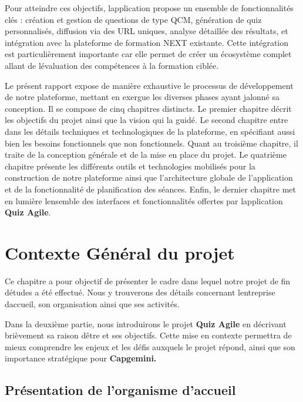 \documentclass[12pt,a4paper,twoside,openright]{report}
\let\origchapter\chapter
\renewcommand{\chapter}[1]{%
  \cleardoublepage%
  \origchapter{#1}%
}
\begin{document}
Pour atteindre ces objectifs, l\textquotesingle application propose un
ensemble de fonctionnalités clés : création et gestion de questions de
type QCM, génération de quiz personnalisés, diffusion via des URL
uniques, analyse détaillée des résultats, et intégration avec la
plateforme de formation NEXT existante. Cette intégration est
particulièrement importante car elle permet de créer un écosystème
complet allant de l\textquotesingle évaluation des compétences à la
formation ciblée.

Le présent rapport expose de manière exhaustive le processus de
développement de notre plateforme, mettant en exergue les diverses
phases ayant jalonné sa conception. Il se compose de cinq chapitres
distincts. Le premier chapitre décrit les objectifs du projet ainsi que
la vision qui l\textquotesingle a guidé. Le second chapitre entre dans
les détails techniques et technologiques de la plateforme, en spécifiant
aussi bien les besoins fonctionnels que non fonctionnels. Quant au
troisième chapitre, il traite de la conception générale et de la mise en
place du projet. Le quatrième chapitre présente les différents outils et
technologies mobilisés pour la construction de notre plateforme ainsi
que l'architecture globale de l'application et de la fonctionnalité de
planification des séances. Enfin, le dernier chapitre met en lumière
l\textquotesingle ensemble des interfaces et fonctionnalités offertes
par l\textquotesingle application \textbf{Quiz Agile}.

\chapter{Contexte Général du projet}

Ce chapitre a pour objectif de présenter le cadre dans lequel notre
projet de fin d\textquotesingle études a été effectué. Nous y trouverons
des détails concernant l\textquotesingle entreprise
d\textquotesingle accueil, son organisation ainsi que ses activités.

Dans la deuxième partie, nous introduirons le projet \textbf{Quiz Agile}
en décrivant brièvement sa raison d\textquotesingle être et ses
objectifs. Cette mise en contexte permettra de mieux comprendre les
enjeux et les défis auxquels le projet répond, ainsi que son importance
stratégique pour \textbf{Capgemini.}

\section{Présentation de l'organisme d'accueil}
\end{document}
